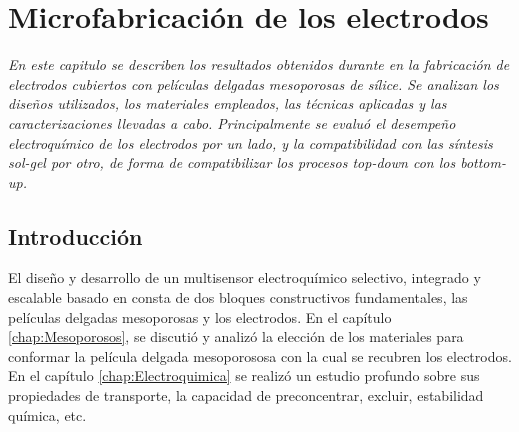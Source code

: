  \newcommand{\NoBiblioMicro}[1]{
 \ifthenelse{\equal{#1}{verdadero}}{}{}
 \NoBiblioMicro{verdadero}}

 
 \FormatoCapituloDosLineas
 
 \chapter{Microfabricación de los electrodos}\label{chap:Microfabricacion}

 \thispagestyle{empty}
	
 \noindent\textit{En este capitulo se describen los resultados obtenidos durante en la fabricación de electrodos cubiertos con películas delgadas mesoporosas de sílice. Se analizan los diseños utilizados, los materiales empleados, las técnicas aplicadas y las caracterizaciones llevadas a cabo. Principalmente se evaluó el desempeño electroquímico de los electrodos por un lado, y la compatibilidad con las síntesis sol-gel por otro, de forma de compatibilizar los procesos \textit{top-down} con los \textit{bottom-up}.}
 
 
 \vfill
 \minitoc
 \newpage

\section{Introducción}
	
	El diseño y desarrollo de un multisensor electroquímico selectivo, integrado y escalable basado en \pdm\space consta de dos bloques constructivos fundamentales, las películas delgadas mesoporosas y los electrodos. En el capítulo \ref{chap:Mesoporosos}, se discutió y analizó la elección de los materiales para conformar la película delgada mesoporososa con la cual se recubren los electrodos. En el capítulo \ref{chap:Electroquimica} se realizó un estudio profundo sobre sus propiedades de transporte, la capacidad de preconcentrar, excluir, estabilidad química, etc.

